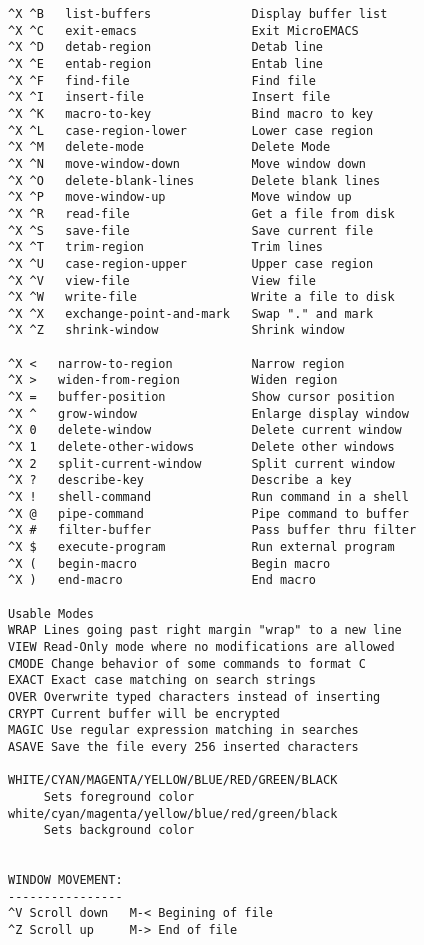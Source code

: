 \begin{verbatim}
^X ^B   list-buffers              Display buffer list
^X ^C   exit-emacs                Exit MicroEMACS
^X ^D   detab-region              Detab line
^X ^E   entab-region              Entab line
^X ^F   find-file                 Find file
^X ^I   insert-file               Insert file
^X ^K   macro-to-key              Bind macro to key
^X ^L   case-region-lower         Lower case region
^X ^M   delete-mode               Delete Mode
^X ^N   move-window-down          Move window down
^X ^O   delete-blank-lines        Delete blank lines
^X ^P   move-window-up            Move window up
^X ^R   read-file                 Get a file from disk
^X ^S   save-file                 Save current file
^X ^T   trim-region               Trim lines
^X ^U   case-region-upper         Upper case region
^X ^V   view-file                 View file
^X ^W   write-file                Write a file to disk
^X ^X   exchange-point-and-mark   Swap "." and mark
^X ^Z   shrink-window             Shrink window

^X <   narrow-to-region           Narrow region
^X >   widen-from-region          Widen region
^X =   buffer-position            Show cursor position
^X ^   grow-window                Enlarge display window
^X 0   delete-window              Delete current window
^X 1   delete-other-widows        Delete other windows
^X 2   split-current-window       Split current window
^X ?   describe-key               Describe a key
^X !   shell-command              Run command in a shell
^X @   pipe-command               Pipe command to buffer
^X #   filter-buffer              Pass buffer thru filter
^X $   execute-program            Run external program
^X (   begin-macro                Begin macro
^X )   end-macro                  End macro

Usable Modes
WRAP Lines going past right margin "wrap" to a new line
VIEW Read-Only mode where no modifications are allowed
CMODE Change behavior of some commands to format C
EXACT Exact case matching on search strings
OVER Overwrite typed characters instead of inserting
CRYPT Current buffer will be encrypted
MAGIC Use regular expression matching in searches
ASAVE Save the file every 256 inserted characters

WHITE/CYAN/MAGENTA/YELLOW/BLUE/RED/GREEN/BLACK
     Sets foreground color
white/cyan/magenta/yellow/blue/red/green/black 
     Sets background color


WINDOW MOVEMENT:
----------------
^V Scroll down   M-< Begining of file
^Z Scroll up     M-> End of file



\end{verbatim}
